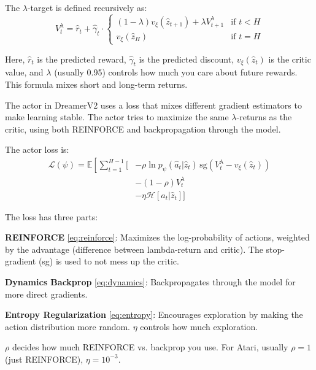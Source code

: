 \documentclass[
	english,
	ruledheaders=section,
	class=report,
	thesis={type=master},
	accentcolor=9c,
	custommargins=true,
	marginpar=false,
	parskip=half-,
	fontsize=11pt,
]{tudapub}
\begin{document}
The $\lambda$-target is defined recursively as:
\begin{equation}
	V^{\lambda}_t = \hat{r}_t + \hat{\gamma}_t \cdot \begin{cases}
		(1 - \lambda)v_\xi(\hat{z}_{t+1}) + \lambda V^{\lambda}_{t+1} & \text{if } t < H \\
		v_\xi(\hat{z}_H)                                              & \text{if } t = H
	\end{cases}
\end{equation}

Here, $\hat{r}_t$ is the predicted reward, $\hat{\gamma}_t$ is the predicted
discount, $v_\xi(\hat{z}_t)$ is the critic value, and $\lambda$ (usually 0.95)
controls how much you care about future rewards. This formula mixes short and
long-term returns.

The actor in DreamerV2 uses a loss that mixes different gradient estimators to
make learning stable. The actor tries to maximize the same $\lambda$-returns as
the critic, using both REINFORCE and backpropagation through the model.

The actor loss is:
\begin{align}
	\mathcal{L}(\psi) = \mathbb{E}\left[\sum_{t=1}^{H-1} \Big[\right. & -\rho \ln p_\psi(\hat{a}_t | \hat{z}_t) \, \text{sg}(V^{\lambda}_t - v_\xi(\hat{z}_t)) \label{eq:reinforce} \\
	                                                                  & -(1-\rho)V^{\lambda}_t \label{eq:dynamics} \\
	                                                                  & -\eta \mathcal{H}[a_t|\hat{z}_t] \Big] \label{eq:entropy}
\end{align}

The loss has three parts:

\textbf{REINFORCE} \eqref{eq:reinforce}: Maximizes the log-probability of actions, weighted by the advantage (difference between lambda-return and critic). The stop-gradient (sg) is used to not mess up the critic.

\textbf{Dynamics Backprop} \eqref{eq:dynamics}: Backpropagates through the model for more direct gradients.

\textbf{Entropy Regularization} \eqref{eq:entropy}: Encourages exploration by making the action distribution more random. $\eta$ controls how much exploration.


$\rho$ decides how much REINFORCE vs. backprop you use. For Atari, usually $\rho=1$ (just REINFORCE), $\eta=10^{-3}$.
\end{document}
